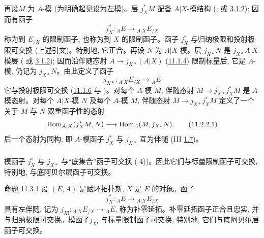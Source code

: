 \subsubsection{}
再设\pageoriginale $M$ 为 $A$-模 (为明确起见设为左模)。层 $j^{\ast}_XM$ 配备 $A|X$-模结构 (; 或 \hyperref[IV.subsubsec3.1.2]{3.1.2}); 因而有函子
$$
j^{\ast}_X:{}_AE\longrightarrow {}_{A|X}E_{/X}
$$
称为到 $E_{/X}$ 的限制函子, 也称为到 $X$ 的限制函子。函子 $j^{\ast}_X$ 与归纳极限和投射极限可交换 (上述引文)。特别地, 它正合。再设 $N$ 为 $A|X$-模。层 $j_{X\ast}N$ 是 $j_{X\ast}A|X$-模层 ( 或 \hyperref[IV.subsubsec3.1.2]{3.1.2}); 因而沿伴随态射 $A\rightarrow j_{X\ast}(A|X)$ (\hyperref[IV.subsubsec11.1.4]{11.1.4}) 限制标量后, 它是 $A$-模, 仍记为 $j_{X\ast}N$。由此定义了函子
$$
j_{X\ast}:{}_{A|X}E_{/X}\longrightarrow {}_AE
$$
它与投射极限可交换 (\hyperref[IV.prop11.1.6]{11.1.6} 与 )。对每个 $A$-模 $M$, 伴随态射 $M\rightarrow j_{X\ast}j^{\ast}_XM$ 是 $A$-模态射。对每个 $A|X$-模 $N$ 及每个 $A$-模 $M$, 伴随态射 $M\rightarrow j_{X\ast}j^{\ast}_XM$ 定义了一个关于 $M$ 与 $N$ 双重函子性的态射
\begin{equation*}
\operatorname{Hom}_{A|X}(j^{\ast}_XM,N)\longrightarrow
\operatorname{Hom}_A(M,j_{X\ast}N){}.\tag{11.2.2.1}
\end{equation*}
后一个态射为同构; 即 $A$-模函子 $j^{\ast}_X$ 与 $j_{X\ast}$ 互为伴随 (III \hyperref[III.prop1.7]{1.7})。

\subsubsection{}
模函子 $j^{\ast}_X$ 与 $j_{X\ast}$ 与“底集合”函子可交换 ( 4))。因此它们与标量限制函子可交换, 特别地, 与底阿贝尔层函子可交换。

\setcounter{subsection}{3} \setcounter{subsubsection}{0}
\begin{enonce*}{命题 11.3.1}
设 $(E,A)$ 是赋环拓扑斯, $X$ 是 $E$ 的对象。函子
$$
j^{\ast}_X:{}_{A}E\longrightarrow {}_{A|X}E_{/X}
$$
具有左伴随, 记为 $j_{X!}:{}_{A|X}E_{/X}\rightarrow {}_{A}E$, 称为补零延拓。补零延拓函子正合且忠实, 并与归纳极限可交换。模函子\pageoriginale $j_{X!}$ 与标量限制函子可交换, 特别地, 它们与底阿贝尔层函子可交换。
\end{enonce*}


